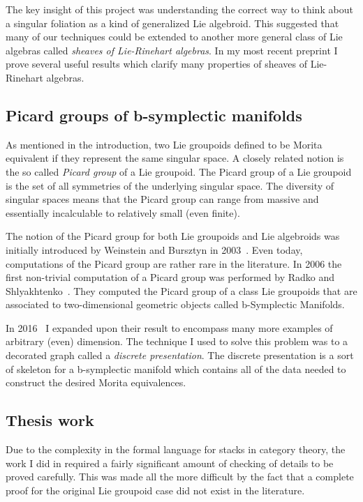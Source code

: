 \documentclass[11pt, letterpaper]{article}
\begin{document}
The key insight of this project was understanding the correct way to think about a singular foliation as a kind of generalized Lie algebroid. This suggested that many of our techniques could be extended to another more general class of Lie algebras called \emph{sheaves of Lie-Rinehart algebras}. In my most recent preprint\cite{fresh} I prove several useful results which clarify many properties of sheaves of Lie-Rinehart algebras.

\subsection{Picard groups of b-symplectic manifolds}
As mentioned in the introduction, two Lie groupoids defined to be Morita equivalent if they represent the same singular space. A closely related notion is the so called \emph{Picard group} of a Lie groupoid. The Picard group of a Lie groupoid is the set of all symmetries of the underlying singular space. The diversity of singular spaces means that the Picard group can range from massive and essentially incalculable to relatively small (even finite).

The notion of the Picard group for both Lie groupoids and Lie algebroids was initially introduced by Weinstein and Bursztyn in 2003~\cite{MR2074983}. Even today, computations of the Picard group are rather rare in the literature. In 2006 the first non-trivial computation of a Picard group was performed by Radko and Shlyakhtenko~\cite{picsurface}. They computed the Picard group of a class Lie groupoids that are associated to two-dimensional geometric objects called b-Symplectic Manifolds.

In 2016~\cite{bsymp} I expanded upon their result to encompass many more examples of arbitrary (even) dimension. The technique I used to solve this problem was to a decorated graph called a \emph{discrete presentation}. The discrete presentation is a sort of skeleton for a b-symplectic manifold which contains all of the data needed to construct the desired Morita equivalences.


\subsection{Thesis work}
Due to the complexity in the formal language for stacks in category theory, the work I did in \cite{dman} required a fairly significant amount of checking of details to be proved carefully. This was made all the more difficult by the fact that a complete proof for the original Lie groupoid case did not exist in the literature. 
\end{document}
